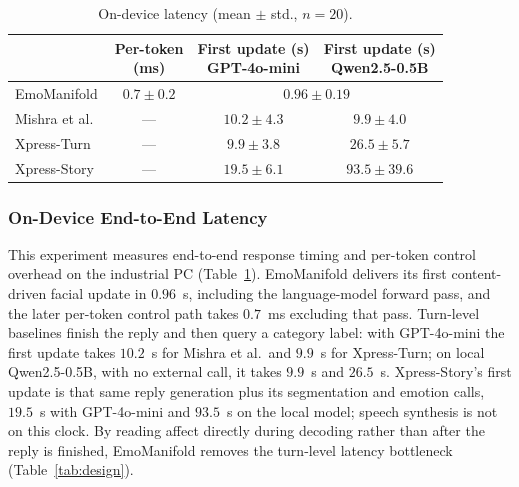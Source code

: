\documentclass[letterpaper, 10 pt, conference]{ieeeconf/ieeeconf}
\begin{document}
\begin{table}[t]
    \caption{On-device latency (mean $\pm$ std., $n{=}20$).}
    \label{tab:latency}
    \centering
    \begin{tabular}{@{}lccc@{}}
    \toprule
    \raisebox{3pt}{System} & \shortstack{Per-token\\(ms)} & \shortstack{First update (s)\\GPT-4o-mini} & \shortstack{First update (s)\\Qwen2.5-0.5B} \\
    \midrule
    EmoManifold & $0.7{\pm}0.2$ & \multicolumn{2}{c}{$0.96{\pm}0.19$} \\
    Mishra et al.~\cite{mishra2023realtime} & --- & $10.2{\pm}4.3$ & $9.9{\pm}4.0$ \\
    Xpress-Turn~\cite{antony2025xpress} & --- & $9.9{\pm}3.8$ & $26.5{\pm}5.7$ \\
    Xpress-Story~\cite{antony2025xpress} & --- & $19.5{\pm}6.1$ & $93.5{\pm}39.6$ \\
    \bottomrule
    \end{tabular}
\end{table}


\subsubsection{On-Device End-to-End Latency}
This experiment measures end-to-end response timing and per-token control overhead on the industrial PC (Table~\ref{tab:latency}). EmoManifold delivers its first content-driven facial update in $0.96$~s, including the language-model forward pass, and the later per-token control path takes $0.7$~ms excluding that pass. Turn-level baselines finish the reply and then query a category label: with GPT-4o-mini the first update takes $10.2$~s for Mishra et al.\ and $9.9$~s for Xpress-Turn; on local Qwen2.5-0.5B, with no external call, it takes $9.9$~s and $26.5$~s. Xpress-Story's first update is that same reply generation plus its segmentation and emotion calls, $19.5$~s with GPT-4o-mini and $93.5$~s on the local model; speech synthesis is not on this clock. By reading affect directly during decoding rather than after the reply is finished, EmoManifold removes the turn-level latency bottleneck (Table~\ref{tab:design}).
\end{document}
